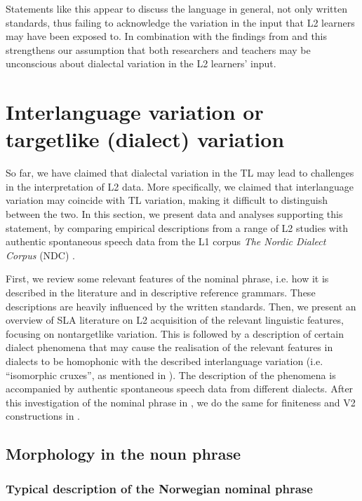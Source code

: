 \documentclass[output=paper,colorlinks,citecolor=brown,modfonts,nonflat]{../langscibook}
\begin{document}
Statements like this appear to discuss the  language in general, not only written standards, thus failing to acknowledge the variation in the input that L2 learners may have been exposed to. In combination with the findings from \citet{Heide2017} and \citet{Husby2009} this strengthens our assumption that both researchers and teachers may be unconscious about dialectal variation in the L2 learners’ input.

\section{Interlanguage variation or targetlike (dialect) variation}\label{sec:emilsen:3}

So far, we have claimed that dialectal variation in the TL may lead to challenges in the interpretation of L2 data. More specifically, we claimed that interlanguage variation may coincide with TL variation, making it difficult to distinguish between the two. In this section, we present data and analyses supporting this statement, by comparing empirical descriptions from a range of L2 studies with authentic spontaneous speech data from the L1 corpus \textit{The Nordic Dialect Corpus} (NDC) \citep{JohannessenEtAl2009}.

First, we review some relevant features of the  nominal phrase, i.e. how it is described in the literature and in descriptive reference grammars. These descriptions are heavily influenced by the written standards. Then, we present an overview of SLA literature on L2 acquisition of the relevant linguistic features, focusing on nontargetlike variation. This is followed by a description of certain dialect phenomena that may cause the realisation of the relevant features in  dialects to be homophonic with the described interlanguage variation (i.e. ``isomorphic cruxes'', as mentioned in ). The description of the phenomena is accompanied by authentic spontaneous speech data from different  dialects. After this investigation of the nominal phrase in , we do the same for finiteness and V2 constructions in .

\subsection{Morphology in the noun phrase}\label{sec:emilsen:3.1}
\subsubsection{Typical description of the Norwegian nominal phrase}
\end{document}
